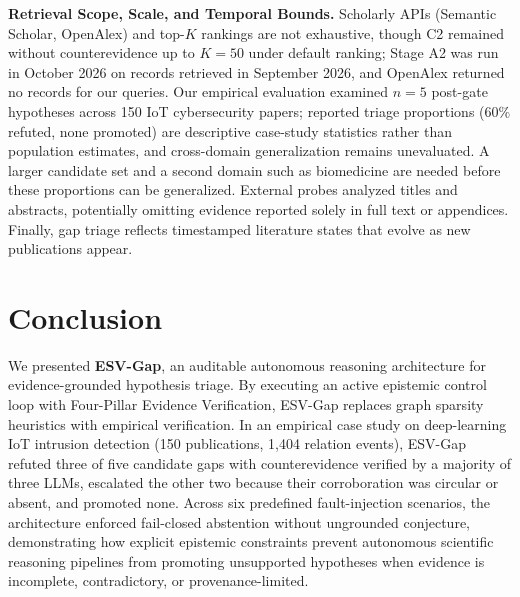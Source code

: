\documentclass[runningheads]{llncs}
\newcommand{\method}{ESV-Gap}
\begin{document}
\noindent\textbf{Retrieval Scope, Scale, and Temporal Bounds.} Scholarly APIs (Semantic Scholar, OpenAlex) and top-$K$ rankings are not exhaustive, though C2 remained without counterevidence up to $K=50$ under default ranking; Stage A2 was run in October 2026 on records retrieved in September 2026, and OpenAlex returned no records for our queries. Our empirical evaluation examined $n=5$ post-gate hypotheses across 150 IoT cybersecurity papers; reported triage proportions ($60\%$ refuted, none promoted) are descriptive case-study statistics rather than population estimates, and cross-domain generalization remains unevaluated. A larger candidate set and a second domain such as biomedicine are needed before these proportions can be generalized. External probes analyzed titles and abstracts, potentially omitting evidence reported solely in full text or appendices. Finally, gap triage reflects timestamped literature states that evolve as new publications appear.

\section{Conclusion}
\label{sec:conclusion}

We presented \textbf{\method{}}, an auditable autonomous reasoning architecture for evidence-grounded hypothesis triage. By executing an active epistemic control loop with Four-Pillar Evidence Verification, \method{} replaces graph sparsity heuristics with empirical verification. In an empirical case study on deep-learning IoT intrusion detection (150 publications, 1,404 relation events), \method{} refuted three of five candidate gaps with counterevidence verified by a majority of three LLMs, escalated the other two because their corroboration was circular or absent, and promoted none. Across six predefined fault-injection scenarios, the architecture enforced fail-closed abstention without ungrounded conjecture, demonstrating how explicit epistemic constraints prevent autonomous scientific reasoning pipelines from promoting unsupported hypotheses when evidence is incomplete, contradictory, or provenance-limited.
\end{document}
